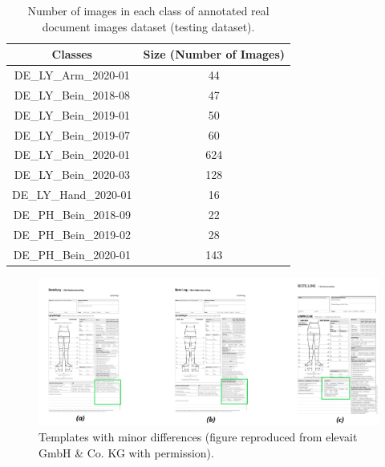 \begin{center}
    \begin{table}[H]
    \begin{center}
    \begin{tabular}{||c c||} 
    \hline
    \textbf{Classes} & \textbf{Size (Number of Images)}\\ [0.5ex] 
    \hline\hline
    DE\_LY\_Arm\_2020-01 & 44 \\ 
    \hline
    DE\_LY\_Bein\_2018-08 & 47 \\
    \hline
    DE\_LY\_Bein\_2019-01 & 50 \\
    \hline
    DE\_LY\_Bein\_2019-07&  60\\
    \hline
    DE\_LY\_Bein\_2020-01&  624\\
    \hline
    DE\_LY\_Bein\_2020-03&  128\\
    \hline
    DE\_LY\_Hand\_2020-01&  16\\
    \hline
    DE\_PH\_Bein\_2018-09&  22\\
    \hline
    DE\_PH\_Bein\_2019-02&  28\\
    \hline    
    DE\_PH\_Bein\_2020-01&  143\\
    \hline    
    \end{tabular}
    \end{center}
    \caption[Number of images in each class of annotated real document images dataset.]{Number of images in each class of annotated real document images dataset (testing dataset).}
    \label{table:testdataset}
    \end{table}
\end{center}


\begin{figure}[H]
        \begin{center}
	    \includegraphics[scale=0.30]{images/Implementation/TemplatesWithMinorDifference.png}
	    \caption[Templates with minor differences.]{Templates with minor differences (figure reproduced from elevait GmbH \& Co. KG with permission).}
	    \label{fig:TemplatesWithMinorDifference}
	    \end{center}
\end{figure}



